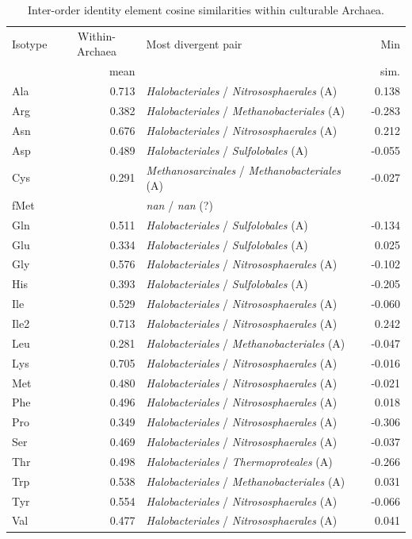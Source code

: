 \begin{table}[!ht]
\centering
\small
\caption{Inter-order identity element cosine similarities within culturable Archaea.}
\label{tab:order_identity_archaea_culturable}
\begin{tabular}{lrlr}
\toprule
Isotype & \multicolumn{1}{c}{Within-Archaea} & Most divergent pair & Min \\
 & mean & & sim. \\
\midrule
  Ala & 0.713 & \textit{Halobacteriales} / \textit{Nitrososphaerales} (A) & 0.138 \\
  Arg & 0.382 & \textit{Halobacteriales} / \textit{Methanobacteriales} (A) & -0.283 \\
  Asn & 0.676 & \textit{Halobacteriales} / \textit{Nitrososphaerales} (A) & 0.212 \\
  Asp & 0.489 & \textit{Halobacteriales} / \textit{Sulfolobales} (A) & -0.055 \\
  Cys & 0.291 & \textit{Methanosarcinales} / \textit{Methanobacteriales} (A) & -0.027 \\
  fMet & \text{---} & \textit{nan} / \textit{nan} (?) & \text{---} \\
  Gln & 0.511 & \textit{Halobacteriales} / \textit{Sulfolobales} (A) & -0.134 \\
  Glu & 0.334 & \textit{Halobacteriales} / \textit{Sulfolobales} (A) & 0.025 \\
  Gly & 0.576 & \textit{Halobacteriales} / \textit{Nitrososphaerales} (A) & -0.102 \\
  His & 0.393 & \textit{Halobacteriales} / \textit{Sulfolobales} (A) & -0.205 \\
  Ile & 0.529 & \textit{Halobacteriales} / \textit{Nitrososphaerales} (A) & -0.060 \\
  Ile2 & 0.713 & \textit{Halobacteriales} / \textit{Nitrososphaerales} (A) & 0.242 \\
  Leu & 0.281 & \textit{Halobacteriales} / \textit{Methanobacteriales} (A) & -0.047 \\
  Lys & 0.705 & \textit{Halobacteriales} / \textit{Nitrososphaerales} (A) & -0.016 \\
  Met & 0.480 & \textit{Halobacteriales} / \textit{Nitrososphaerales} (A) & -0.021 \\
  Phe & 0.496 & \textit{Halobacteriales} / \textit{Nitrososphaerales} (A) & 0.018 \\
  Pro & 0.349 & \textit{Halobacteriales} / \textit{Nitrososphaerales} (A) & -0.306 \\
  Ser & 0.469 & \textit{Halobacteriales} / \textit{Nitrososphaerales} (A) & -0.037 \\
  Thr & 0.498 & \textit{Halobacteriales} / \textit{Thermoproteales} (A) & -0.266 \\
  Trp & 0.538 & \textit{Halobacteriales} / \textit{Methanobacteriales} (A) & 0.031 \\
  Tyr & 0.554 & \textit{Halobacteriales} / \textit{Nitrososphaerales} (A) & -0.066 \\
  Val & 0.477 & \textit{Halobacteriales} / \textit{Nitrososphaerales} (A) & 0.041 \\
\bottomrule
\end{tabular}
\end{table}

